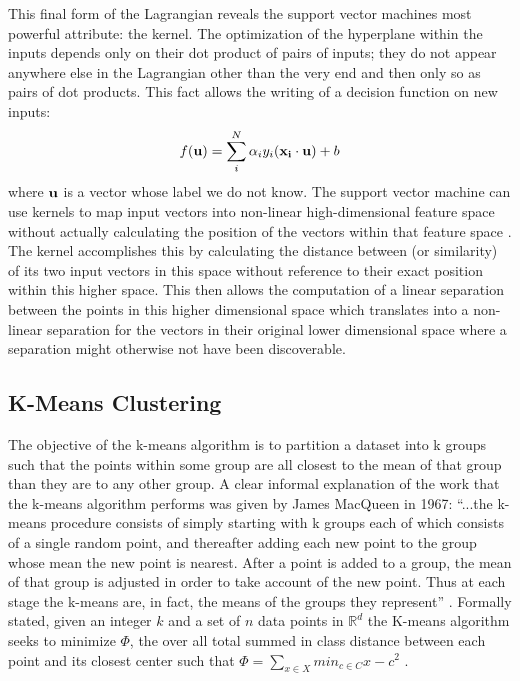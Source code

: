 This final form of the Lagrangian reveals the support vector machines most
powerful attribute: the kernel. The optimization of the hyperplane within the
inputs depends only on their dot product of pairs of inputs; they do not appear
anywhere else in the Lagrangian other than the very end and then only so as
pairs of dot products. This fact allows the writing of a decision function on
new inputs: $$f(\bold{u}) = \sum_{i}^{N}\alpha_{i}y_{i}(\bold{x_i}\cdot\bold{u})+b$$
where $\bold{u}$ is a vector whose label we do not know. The support vector
machine can use kernels to map input vectors into
non-linear high-dimensional feature space without actually calculating the
position of the vectors within that feature space \cite{Vapnik}. The kernel
accomplishes this by calculating the distance between (or similarity) of its two
input vectors in this space without reference to their exact position within
this higher space. This then allows the computation of a linear separation
between the points in this higher dimensional space which translates into a
non-linear separation for the vectors in their original lower dimensional space
where a separation might otherwise not have been discoverable.
\subsection{K-Means Clustering}
The objective of the k-means algorithm is to partition a dataset into k groups
such that the points within some group are all closest to
the mean of that group than they are to any other group. A clear
informal explanation of the work that the k-means algorithm performs
was given by James MacQueen in 1967: ``...the k-means procedure
consists of simply starting with k groups each of which consists of a
single random point, and thereafter adding each new point to the
group whose mean the new point is nearest. After a point is added to
a group, the mean of that group is adjusted in order to take account
of the new point. Thus at each stage the k-means are, in fact, the
means of the groups they represent'' \cite{MacQueen}. Formally stated,
given an integer $k$ and a set of $n$ data points in
$\mathbb{R}^{d}$ the K-means algorithm seeks to minimize  $\Phi$, the
over all total summed in class distance between each point and its
closest center such that $\mathbb \Phi = \sum_{x \in X} min_{c \in C}{x-c^{2}}$
\cite{Arthur}.

